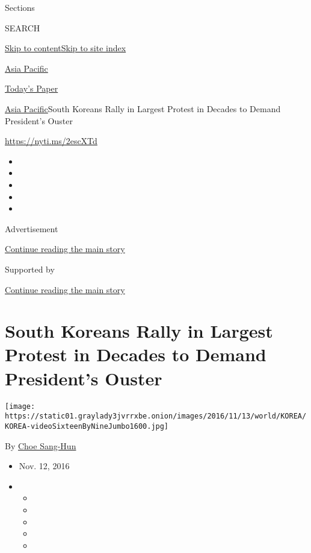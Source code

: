 Sections

SEARCH

\protect\hyperlink{site-content}{Skip to
content}\protect\hyperlink{site-index}{Skip to site index}

\href{https://www.nytimes3xbfgragh.onion/section/world/asia}{Asia
Pacific}

\href{https://myaccount.nytimes3xbfgragh.onion/auth/login?response_type=cookie\&client_id=vi}{}

\href{https://www.nytimes3xbfgragh.onion/section/todayspaper}{Today's
Paper}

\href{/section/world/asia}{Asia Pacific}\textbar{}South Koreans Rally in
Largest Protest in Decades to Demand President's Ouster

\url{https://nyti.ms/2escXTd}

\begin{itemize}
\item
\item
\item
\item
\item
\end{itemize}

Advertisement

\protect\hyperlink{after-top}{Continue reading the main story}

Supported by

\protect\hyperlink{after-sponsor}{Continue reading the main story}

\hypertarget{south-koreans-rally-in-largest-protest-in-decades-to-demand-presidents-ouster}{%
\section{South Koreans Rally in Largest Protest in Decades to Demand
President's
Ouster}\label{south-koreans-rally-in-largest-protest-in-decades-to-demand-presidents-ouster}}

\texttt{[image: https://static01.graylady3jvrrxbe.onion/images/2016/11/13/world/KOREA/KOREA-videoSixteenByNineJumbo1600.jpg]}

By \href{http://www.nytimes3xbfgragh.onion/by/choe-sang-hun}{Choe
Sang-Hun}

\begin{itemize}
\item
  Nov. 12, 2016
\item
  \begin{itemize}
  \item
  \item
  \item
  \item
  \item
  \end{itemize}
\end{itemize}

